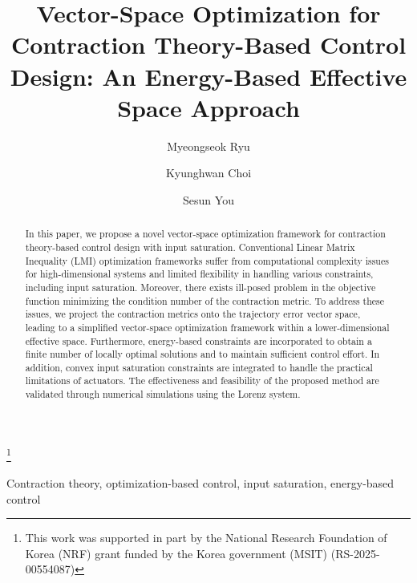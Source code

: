 \documentclass{ifacconf}
\begin{document}
\begin{frontmatter}

\title{
   Vector-Space Optimization for Contraction Theory-Based Control Design: An Energy-Based Effective Space Approach
} 

\thanks[footnoteinfo]{
   This work was supported in part by the National Research Foundation of Korea (NRF) grant funded by the Korea government (MSIT) (RS-2025-00554087)
}

\author[First]{Myeongseok Ryu} 
\author[First]{Kyunghwan Choi} 
\author[Second]{Sesun You}

\address[First]{
   Korea Advanced Institute of Science and Technology (KAIST), 
   Daejeon 34051, South Korea (e-mail: \{dding\_98, kh.choi\}@kaist.ac.kr)}
\address[Second]{
   Keimyung University, 
   Daegu 42601, South Korea (e-mail: yousesun@kmu.ac.kr)}

\begin{abstract}                %
   In this paper, we propose a novel vector-space optimization framework for contraction theory-based control design with input saturation.
   Conventional Linear Matrix Inequality (LMI) optimization frameworks suffer from computational complexity issues for high-dimensional systems and limited flexibility in handling various constraints, including input saturation.
   Moreover, there exists ill-posed problem in the objective function minimizing the condition number of the contraction metric.
   To address these issues, we project the contraction metrics onto the trajectory error vector space, leading to a simplified vector-space optimization framework within a lower-dimensional effective space.
   Furthermore, energy-based constraints are incorporated to obtain a finite number of locally optimal solutions and to maintain sufficient control effort.
   In addition, convex input saturation constraints are integrated to handle the practical limitations of actuators.
   The effectiveness and feasibility of the proposed method are validated through numerical simulations using the Lorenz system.
\end{abstract}

\begin{keyword}
   Contraction theory, 
   optimization-based control,
   input saturation, 
   energy-based control
\end{keyword}

\end{frontmatter}
\end{document}
